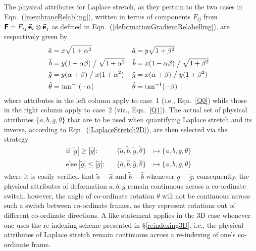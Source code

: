 The physical attributes for Laplace stretch, as they pertain to the two cases in Eqn.~(\ref{membraneRelabling}), written in terms of components $F_{ij}$ from $\boldsymbol{\mathsf{F}} = F_{ij} \, \vec{\boldsymbol{\mathsf{e}}}_i \otimes \vec{\boldsymbol{\mathsf{e}}}_j$ as defined in Eqn.~(\ref{deformationGradientRelabelling}), are respectively given by
\begin{subequations}
	\label{physicalAttributes}
	\begin{align}
	\tilde{a} & = x \sqrt{1 + \alpha^2} & 
	\hat{a} & = y \sqrt{1 + \beta^2} 
	\label{aAttribute} \\
	\tilde{b} & = y ( 1 - \alpha \beta ) \bigm/ \sqrt{1 + \alpha^2} &
	\hat{b} & = x ( 1 - \alpha \beta ) \bigm/ \sqrt{1 + \beta^2} 
	\label{bAttribute} \\ 
	\tilde{g} & = y ( \alpha + \beta ) \bigm/ x (1 + \alpha^2) &
	\hat{g} & = x ( \alpha + \beta ) \bigm/ y (1 + \beta^2)
	\label{gAttribute} \\
	\tilde{\theta} & = \tan^{-1} ( -\alpha ) & 
	\hat{\theta} & = \tan^{-1} ( -\beta )
	\label{thetaAttribute}
	\end{align}
\end{subequations}
where attributes in the left column apply to case~1 (i.e., Eqn.~\ref{Q0}) while those in the right column apply to case~2 (viz., Eqn.~\ref{Q1}).  The actual set of physical attributes $\{ a, b, g, \theta \}$ that are to be used when quantifying Laplace stretch and its inverse, according to Eqn.~(\ref{LaplaceStretch2D}), are then selected via the strategy  
\begin{subequations}
	\label{attributeMaps}
	\begin{align}
	\mathrm{if} \; | \tilde{g} | \geq | \hat{g} | : & &
	\{ \tilde{a} , \tilde{b} , \tilde{g} , \tilde{\theta} \} &
	\mapsto \{ a , b , g , \theta \}  \\
	\mathrm{else} \; | \tilde{g} | \leq | \hat{g} | : & &
	\{ \hat{a} , \hat{b} , \hat{g} , \hat{\theta} \} & 
	\mapsto \{ a , b , g , \theta \}
	\end{align}
\end{subequations}
where it is easily verified that $\tilde{a} = \hat{a}$ and $\tilde{b} = \hat{b}$ whenever $\tilde{g} = \hat{g}$; consequently, the physical attributes of deformation $a , b , g$ remain continuous across a co-ordinate switch, however, the angle of co-ordinate rotation $\theta$ will not be continuous across such a switch between co-ordinate frames, as they represent rotations out of different co-ordinate directions.  A like statement applies in the 3D case whenever one uses the re-indexing scheme presented in \S\ref{reindexing3D}, i.e., the physical attributes of Laplace stretch remain continuous across a re-indexing of one's co-ordinate frame.

